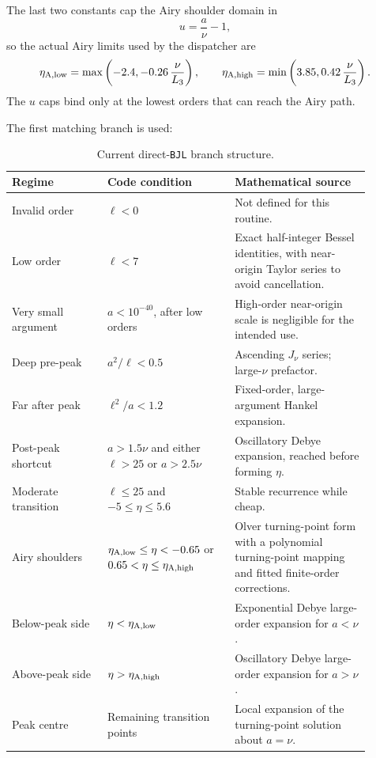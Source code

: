 \documentclass[11pt,a4paper]{article}
\newcommand{\code}[1]{\texttt{#1}}
\begin{document}
The last two constants cap the Airy shoulder domain in
\begin{equation}
  u=\frac{a}{\nu}-1,
\end{equation}
so the actual Airy limits used by the dispatcher are
\begin{equation}
  \eta_{\rm A,low}=\max\left(-2.4,-0.26\,\frac{\nu}{L_3}\right),
  \qquad
  \eta_{\rm A,high}=\min\left(3.85,0.42\,\frac{\nu}{L_3}\right).
\end{equation}
The $u$ caps bind only at the lowest orders that can reach the Airy path.

The first matching branch is used:
\begin{table}[htbp]
\centering
\small
\begin{tabular}{p{0.24\linewidth}p{0.32\linewidth}p{0.34\linewidth}}
\toprule
Regime & Code condition & Mathematical source \\
\midrule
Invalid order & $\ell<0$ & Not defined for this routine. \\
Low order & $\ell<7$ & Exact half-integer Bessel identities, with near-origin Taylor series to avoid cancellation. \\
Very small argument & $a<10^{-40}$, after low orders & High-order near-origin scale is negligible for the intended use. \\
Deep pre-peak & $a^2/\ell<0.5$ & Ascending $J_\nu$ series; large-$\nu$ prefactor. \\
Far after peak & $\ell^2/a<1.2$ & Fixed-order, large-argument Hankel expansion. \\
Post-peak shortcut & $a>1.5\nu$ and either $\ell>25$ or $a>2.5\nu$ & Oscillatory Debye expansion, reached before forming $\eta$. \\
Moderate transition & $\ell\le25$ and $-5\le\eta\le5.6$ & Stable recurrence while cheap. \\
Airy shoulders & $\eta_{\rm A,low}\le\eta<-0.65$ or $0.65<\eta\le\eta_{\rm A,high}$ & Olver turning-point form with a polynomial turning-point mapping and fitted finite-order corrections. \\
Below-peak side & $\eta<\eta_{\rm A,low}$ & Exponential Debye large-order expansion for $a<\nu$. \\
Above-peak side & $\eta>\eta_{\rm A,high}$ & Oscillatory Debye large-order expansion for $a>\nu$. \\
Peak centre & Remaining transition points & Local expansion of the turning-point solution about $a=\nu$. \\
\bottomrule
\end{tabular}
\caption{Current direct-\code{BJL} branch structure.}
\label{tab:branches}
\end{table}
\end{document}
